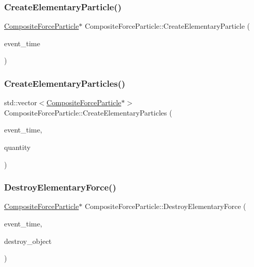 \subsubsection{\texorpdfstring{Create\+Elementary\+Particle()}{CreateElementaryParticle()}}
{\footnotesize\ttfamily \mbox{\hyperlink{class_composite_force_particle}{Composite\+Force\+Particle}}$\ast$ Composite\+Force\+Particle\+::\+Create\+Elementary\+Particle (\begin{DoxyParamCaption}\item[{std\+::chrono\+::time\+\_\+point$<$ \mbox{\hyperlink{universe_8h_a0ef8d951d1ca5ab3cfaf7ab4c7a6fd80}{Clock}} $>$}]{event\+\_\+time }\end{DoxyParamCaption})}

\mbox{\label{class_composite_force_particle_afff866fe6f363c33c3b49fcca9005706}} 
\subsubsection{\texorpdfstring{Create\+Elementary\+Particles()}{CreateElementaryParticles()}}
{\footnotesize\ttfamily std\+::vector$<$\mbox{\hyperlink{class_composite_force_particle}{Composite\+Force\+Particle}}$\ast$$>$ Composite\+Force\+Particle\+::\+Create\+Elementary\+Particles (\begin{DoxyParamCaption}\item[{std\+::chrono\+::time\+\_\+point$<$ \mbox{\hyperlink{universe_8h_a0ef8d951d1ca5ab3cfaf7ab4c7a6fd80}{Clock}} $>$}]{event\+\_\+time,  }\item[{int}]{quantity }\end{DoxyParamCaption})}

\mbox{\label{class_composite_force_particle_af12bbef12781e7b72a4569609f751af6}} 
\subsubsection{\texorpdfstring{Destroy\+Elementary\+Force()}{DestroyElementaryForce()}}
{\footnotesize\ttfamily \mbox{\hyperlink{class_composite_force_particle}{Composite\+Force\+Particle}}$\ast$ Composite\+Force\+Particle\+::\+Destroy\+Elementary\+Force (\begin{DoxyParamCaption}\item[{std\+::chrono\+::time\+\_\+point$<$ \mbox{\hyperlink{universe_8h_a0ef8d951d1ca5ab3cfaf7ab4c7a6fd80}{Clock}} $>$}]{event\+\_\+time,  }\item[{\mbox{\hyperlink{class_composite_force_particle}{Composite\+Force\+Particle}} $\ast$}]{destroy\+\_\+object }\end{DoxyParamCaption})}

